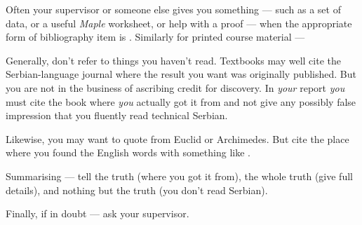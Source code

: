 Often your supervisor or someone else gives you something --- such
as a set of data, or a useful \textsl{Maple} worksheet, or help with a
proof --- when the appropriate form of bibliography item is
. Similarly for
printed course material --- 
\par
Generally, don't refer to things you haven't read. Textbooks may well
cite the Serbian-language journal where the result you want was
originally published. But you are not in the business of ascribing
credit for discovery. In \textit{your} report \textit{you} must cite the
book where \textit{you} actually got it from and not give any possibly
false impression that you fluently read technical Serbian.
\par
Likewise, you may want to quote from Euclid or Archimedes.
But cite the place where you found the English words with something like
.
\par
Summarising --- tell the truth (where you got it from), the whole truth
(give full details), and nothing but the truth (you don't read Serbian).
\par
Finally, if in doubt --- ask your supervisor.
